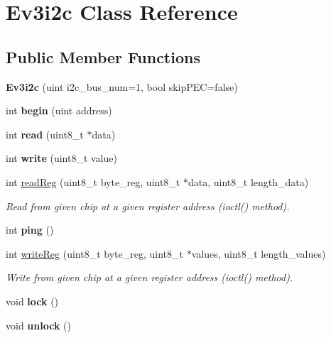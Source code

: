 \hypertarget{classEv3i2c}{}\section{Ev3i2c Class Reference}
\label{classEv3i2c}
\subsection*{Public Member Functions}
\begin{DoxyCompactItemize}
\item 
\mbox{\label{classEv3i2c_ab9b4320cc4496499d2ded20b6cb1be8d}} 
{\bfseries Ev3i2c} (uint i2c\+\_\+bus\+\_\+num=1, bool skip\+P\+EC=false)
\item 
\mbox{\label{classEv3i2c_a96d8978ddbc6fc555e2895cbcedf2aa4}} 
int {\bfseries begin} (uint address)
\item 
\mbox{\label{classEv3i2c_ac13dcbc09948990c2f6ad32feff9fae4}} 
int {\bfseries read} (uint8\+\_\+t $\ast$data)
\item 
\mbox{\label{classEv3i2c_aa305f12f81d5afa4c3e8ad8570092f75}} 
int {\bfseries write} (uint8\+\_\+t value)
\item 
int \hyperlink{classEv3i2c_af066212d586367d9a9665ddf3fda3b0f}{read\+Reg} (uint8\+\_\+t byte\+\_\+reg, uint8\+\_\+t $\ast$data, uint8\+\_\+t length\+\_\+data)
\begin{DoxyCompactList}\small\item\em Read from given chip at a given register address (ioctl() method). \end{DoxyCompactList}\item 
\mbox{\label{classEv3i2c_a187d4f62d50cc4c21a37adb374d4a8ad}} 
int {\bfseries ping} ()
\item 
int \hyperlink{classEv3i2c_aa9918de4e586386af5d8bd9928d54db9}{write\+Reg} (uint8\+\_\+t byte\+\_\+reg, uint8\+\_\+t $\ast$values, uint8\+\_\+t length\+\_\+values)
\begin{DoxyCompactList}\small\item\em Write from given chip at a given register address (ioctl() method). \end{DoxyCompactList}\item 
\mbox{\label{classEv3i2c_a9c6aa651d7b07bf559435dd53f99989f}} 
void {\bfseries lock} ()
\item 
\mbox{\label{classEv3i2c_a0fa2c8a320f6a75992ea5a60c95fc637}} 
void {\bfseries unlock} ()
\end{DoxyCompactItemize}


